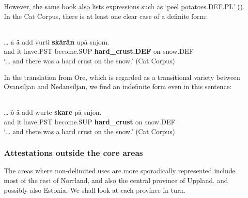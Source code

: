 \z

However, the same book also lists expressions such as  ‘peel potatoes.DEF.PL’ (\citet[176]{AnderssonEtAl1999}). In the Cat Corpus, there is at least one clear case of a definite form:

\ea \label{} 
\\
\gll …  å  ä  add  vurti  \textbf{skårån} upå  snjom.\\
  and  it  have.PST  become.SUP  \textbf{hard\_crust.DEF} on  snow.DEF\\
\glt ‘… and there was a hard crust on the snow.’ (Cat Corpus)

\z

In the translation from Ore, which is regarded as a transitional variety between Ovansiljan and Nedansiljan, we find an indefinite form even in this sentence:

\ea \label{} 
\\
\gll …  ô  ä  add  wurte  \textbf{skare} på  snjon.\\
  and  it  have.PST  become.SUP  \textbf{hard\_crust} on  snow.DEF\\
\glt ‘… and there was a hard crust on the snow.’ (Cat Corpus)

\z

\subsubsection{Attestations outside the core areas}
 The areas where non-delimited uses are more sporadically represented include most of the rest of Norrland, and also the central province of Uppland, and possibly also Estonia. We shall look at each province in turn.

